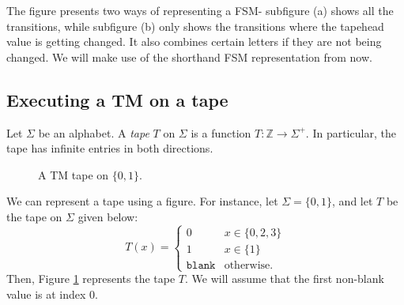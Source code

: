 The figure presents two ways of representing a FSM- subfigure (a) shows all the transitions, while subfigure (b) only shows the transitions where the tapehead value is getting changed. It also combines certain letters if they are not being changed. We will make use of the shorthand FSM representation from now.

\subsection{Executing a TM on a tape}
Let $\Sigma$ be an alphabet. A \emph{tape} $T$ on $\Sigma$ is a function $T\colon \mathbb{Z} \to \Sigma^+$. In particular, the tape has infinite entries in both directions. 

\begin{figure}[htb]
    \centering
    \caption{A TM tape on $\{0, 1\}$.}
    \label{fig:tape_example}
\end{figure}
We can represent a tape using a figure. For instance, let $\Sigma = \{0, 1\}$, and let $T$ be the tape on $\Sigma$ given below:
\[T(x) = \begin{cases}
    0 & x \in \{0, 2, 3\} \\
    1 & x \in \{1\} \\
    \texttt{blank} & \text{otherwise}.
\end{cases}\]
Then, Figure \ref{fig:tape_example} represents the tape $T$. We will assume that the first non-blank value is at index 0.

